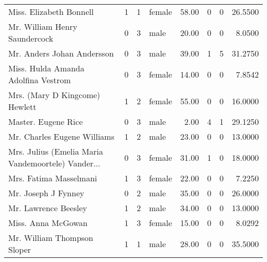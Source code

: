 \begin{tabular}{lrrlrrrr}
Miss. Elizabeth Bonnell                            &         1 &       1 &  female &  58.00 &                        0 &                        0 &   26.5500 \\
Mr. William Henry Saundercock                      &         0 &       3 &    male &  20.00 &                        0 &                        0 &    8.0500 \\
Mr. Anders Johan Andersson                         &         0 &       3 &    male &  39.00 &                        1 &                        5 &   31.2750 \\
Miss. Hulda Amanda Adolfina Vestrom                &         0 &       3 &  female &  14.00 &                        0 &                        0 &    7.8542 \\
Mrs. (Mary D Kingcome) Hewlett                     &         1 &       2 &  female &  55.00 &                        0 &                        0 &   16.0000 \\
Master. Eugene Rice                                &         0 &       3 &    male &   2.00 &                        4 &                        1 &   29.1250 \\
Mr. Charles Eugene Williams                        &         1 &       2 &    male &  23.00 &                        0 &                        0 &   13.0000 \\
Mrs. Julius (Emelia Maria Vandemoortele) Vander... &         0 &       3 &  female &  31.00 &                        1 &                        0 &   18.0000 \\
Mrs. Fatima Masselmani                             &         1 &       3 &  female &  22.00 &                        0 &                        0 &    7.2250 \\
Mr. Joseph J Fynney                                &         0 &       2 &    male &  35.00 &                        0 &                        0 &   26.0000 \\
Mr. Lawrence Beesley                               &         1 &       2 &    male &  34.00 &                        0 &                        0 &   13.0000 \\
Miss. Anna McGowan                                 &         1 &       3 &  female &  15.00 &                        0 &                        0 &    8.0292 \\
Mr. William Thompson Sloper                        &         1 &       1 &    male &  28.00 &                        0 &                        0 &   35.5000 \\

\end{tabular}

